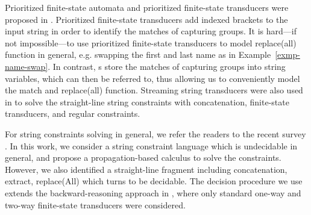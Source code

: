 Prioritized finite-state automata and prioritized finite-state transducers were proposed in \cite{BM17}. Prioritized finite-state transducers add indexed brackets to the input string in order to identify the matches of capturing groups. It is hard---if not impossible---to use prioritized finite-state transducers to model replace(all) function in general, e.g. swapping the first and last name as in Example~\ref{exmp-name-swap}. In contrast, {\PSST}s store the matches of capturing groups into string variables, which can then be referred to, thus allowing us to conveniently model the match and replace(all) function. 
%
Streaming string transducers were also used in \cite{ZAM19} to solve the straight-line string constraints with concatenation, finite-state transducers, and regular constraints.

For string constraints solving in general, we refer the readers to the recent survey \cite{Ama20}. In this work, we consider a string constraint language which is undecidable in general, and propose a propagation-based calculus to solve the constraints. However, we also identified a straight-line fragment including concatenation, extract, replace(All) which turns to be decidable. The decision procedure we use extends the backward-reasoning approach in \cite{CHL+19}, where only standard one-way and two-way finite-state transducers were considered. 
